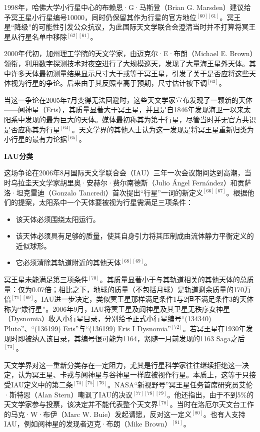 1998年，哈佛大学小行星中心的布赖恩·G·马斯登（Brian G. Marsden）建议给予冥王星小行星编号10000，同时仍保留其作为行星的官方地位\(^{[60][61]}\)。冥王星“降级”的可能性引发公众抗议，为此国际天文学联合会澄清当时并不打算将冥王星从行星名单中移除\(^{[62][61]}\)。

2000年代初，加州理工学院的天文学家，由迈克尔·E·布朗（Michael E. Brown）领衔，利用数字探测技术对夜空进行了大规模巡天，发现了大量海王星外天体。其中许多天体最初测量结果显示尺寸大于或等于冥王星，引发了关于是否应将这些天体视为行星的争论。后来由于其反照率高于预期，尺寸估计被下调\(^{[63]}\)。

当这一争论在2005年7月变得无法回避时，这些天文学家宣布发现了一颗新的天体——阋神星（Eris），其质量显著大于冥王星，并且是自1846年发现海卫一以来太阳系中发现的最为巨大的天体。媒体最初称其为第十行星，尽管当时并无官方共识是否应称其为行星\(^{[64]}\)。天文学界的其他人士认为这一发现是将冥王星重新归类为小行星的最有力论据\(^{[65]}\)。

\textbf{IAU分类}

这场争论在2006年8月国际天文学联合会（IAU）三年一次会议期间达到高潮，当时乌拉圭天文学家胡里奥·安赫尔·费尔南德斯（Julio Ángel Fernández）和贡萨洛·坦克雷迪（Gonzalo Tancredi）首次提出“行星”一词的新定义\(^{[66][67]}\)。根据他们的提案，太阳系中一个天体要被视为行星需满足三项条件：
\begin{itemize}
\item 该天体必须围绕太阳运行。
\item 该天体必须具有足够的质量，使其自身引力将其压制成由流体静力平衡定义的近似球形。
\item 它必须清除其轨道附近的其他天体\(^{[68][69]}\)。
\end{itemize}
冥王星未能满足第三项条件\(^{[70]}\)。其质量显著小于与其轨道相关的其他天体的总质量：仅为0.07倍；相比之下，地球的质量（不包括月球）是轨道剩余质量的170万倍\(^{[71][69]}\)。IAU进一步决定，类似冥王星那样满足条件1与2但不满足条件3的天体称为“矮行星”。2006年9月，IAU将冥王星及阋神星及其卫星无秩序女神星（Dysnomia）收入小行星目录，分别给予正式小行星编号“(134340) Pluto”、“(136199) Eris”与“(136199) Eris I Dysnomia”\(^{[72]}\)。若冥王星在1930年发现时即被纳入该目录，其编号很可能为1164，紧随一月前发现的1163 Saga之后\(^{[73]}\)。

天文学界对这一重新分类存在一定阻力，尤其是行星科学家往往继续拒绝这一决定，认为冥王星、卡戎与阋神星与谷神星一样应被视作行星。本质上，这等于只接受IAU定义中的第二条\(^{[74][75][76]}\)。NASA“新视野号”冥王星任务首席研究员艾伦·斯特恩（Alan Stern）嘲讽了IAU的决议\(^{[77][78][79]}\)。他还指出，由于不到5\%的天文学家参与投票，该决定并不能代表整个天文界\(^{[78]}\)。当时在洛厄尔天文台工作的马克·W·布伊（Marc W. Buie）发起请愿，反对这一定义\(^{[80]}\)。也有人支持IAU，例如阋神星的发现者迈克·布朗（Mike Brown）\(^{[81]}\)。

